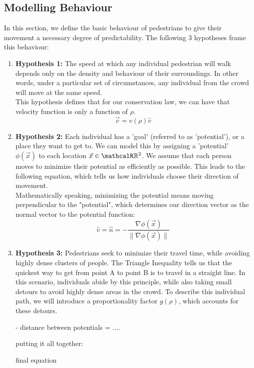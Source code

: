 \documentclass{article}
\begin{document}
\subsection{Modelling Behaviour}
In this section, we define the basic behaviour of pedestrians to give their movement a necessary degree of predictability. The following 3 hypotheses frame this behaviour:
\begin{enumerate}
    \item \textbf{Hypothesis 1:} The speed at which any individual pedestrian will walk depends only on the density and behaviour of their surroundings. In other words, under a particular set of circumstances, any individual from the crowd will move at the same speed.
    \\
    This hypothesis defines that for our conservation law, we can have that velocity function is only a function of $\rho$.
    \begin{equation}
        \vec{v} = v(\rho) \hat{v}\label{hyp1}
    \end{equation}
    
    
    \item \textbf{Hypothesis 2:} Each individual has a 'goal' (referred to as 'potential'), or a place they want to get to. We can model this by assigning a 'potential' $\phi(\vec x)$ to each location $\vec x \in\mathcalR \mathbb R^2$. We assume that each person moves to minimize their potential as efficiently as possible. This leads to the following equation,  which tells us how individuals choose their direction of movement.
    \\
    Mathematically speaking, minimizing the potential means moving perpendicular to the "potential", which determines our direction vector as the normal vector to the potential function:
    \begin{equation}
         \hat{v} = \hat{n} = -\frac{\nabla\phi(\vec x)}{\|\nabla\phi(\vec x)\|}
    \end{equation}
    
    
    \item \textbf{Hypothesis 3:} Pedestrians seek to minimize their travel time, while avoiding highly dense clusters of people. The Triangle Inequality tells us that the quickest way to get from point A to point B is to travel in a straight line. In this scenario, individuals abide by this principle, while also taking small detours to avoid highly dense areas in the crowd. To describe this individual path, we will introduce a proportionality factor $g(\rho)$, which accounts for these detours.
    
    - distance between potentials = ....
    
    
    putting it all together:
    
    final equation
    
    
    
    
\end{enumerate}
\end{document}
